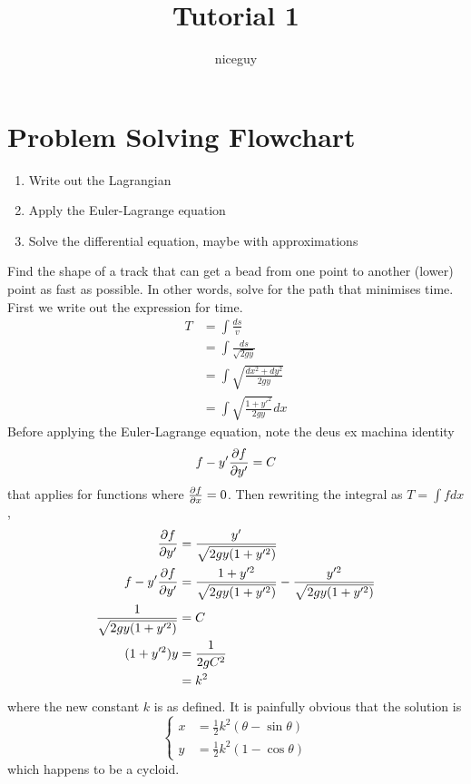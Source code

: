 \documentclass[12pt]{article}
\title{Tutorial 1}
\author{niceguy}
\begin{document}
\maketitle

\section{Problem Solving Flowchart}

\begin{enumerate}
    \item Write out the Lagrangian
    \item Apply the Euler-Lagrange equation
    \item Solve the differential equation, maybe with approximations
\end{enumerate}

\begin{ex}
    Find the shape of a track that can get a bead from one point to another (lower) point as fast as possible. In other words, solve for the path that minimises time. First we write out the expression for time.
    \begin{align*}
        T &= \int \frac{ds}{v} \\
          &= \int \frac{ds}{\sqrt{2gy}} \\
          &= \int \sqrt{\frac{dx^2+dy^2}{2gy}} \\
          &= \int \sqrt{\frac{1+y'^2}{2gy}} dx
    \end{align*}
    Before applying the Euler-Lagrange equation, note the deus ex machina identity
    $$f - y'\frac{\partial f}{\partial y'} = C$$
    that applies for functions where $\frac{\partial f}{\partial x} = 0$. Then rewriting the integral as $T = \int fdx$,
    \begin{align*}
        \frac{\partial f}{\partial y'} &= \frac{y'}{\sqrt{2gy(1+y'^2)}} \\
        f - y'\frac{\partial f}{\partial y'} &= \frac{1+y'^2}{\sqrt{2gy(1+y'^2)}} - \frac{y'^2}{\sqrt{2gy(1+y'^2)}} \\
        \frac{1}{\sqrt{2gy(1+y'^2)}} &= C \\
        (1+y'^2)y &= \frac{1}{2gC^2} \\
                  &= k^2
    \end{align*}
    where the new constant $k$ is as defined. It is painfully obvious that the solution is
    $$\begin{cases} x &= \frac{1}{2} k^2(\theta - \sin\theta) \\ y &= \frac{1}{2} k^2(1 - \cos\theta) \end{cases}$$
    which happens to be a cycloid.
\end{ex}
\end{document}
